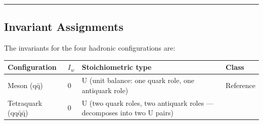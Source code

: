 \documentclass[12pt,a4paper]{article}
\begin{document}
\begin{center}\rule{0.5\linewidth}{0.5pt}\end{center}

\hypertarget{invariant-assignments}{%
\subsection{Invariant Assignments}\label{invariant-assignments}}

The invariants for the four hadronic configurations are:

\begin{longtable}[]{@{}llll@{}}
\toprule
\begin{minipage}[b]{0.22\columnwidth}\raggedright
Configuration\strut
\end{minipage} & \begin{minipage}[b]{0.22\columnwidth}\raggedright
\(I_w\)\strut
\end{minipage} & \begin{minipage}[b]{0.22\columnwidth}\raggedright
Stoichiometric type\strut
\end{minipage} & \begin{minipage}[b]{0.22\columnwidth}\raggedright
Class\strut
\end{minipage}\tabularnewline
\midrule
\endhead
\begin{minipage}[t]{0.22\columnwidth}\raggedright
Meson (qq̄)\strut
\end{minipage} & \begin{minipage}[t]{0.22\columnwidth}\raggedright
0\strut
\end{minipage} & \begin{minipage}[t]{0.22\columnwidth}\raggedright
U (unit balance: one quark role, one antiquark role)\strut
\end{minipage} & \begin{minipage}[t]{0.22\columnwidth}\raggedright
Reference\strut
\end{minipage}\tabularnewline
\begin{minipage}[t]{0.22\columnwidth}\raggedright
Tetraquark (qqq̄q̄)\strut
\end{minipage} & \begin{minipage}[t]{0.22\columnwidth}\raggedright
0\strut
\end{minipage} & \begin{minipage}[t]{0.22\columnwidth}\raggedright
U (two quark roles, two antiquark roles --- decomposes into two U
pairs)\strut
\end{minipage} & \begin{minipage}[t]{0.22\columnwidth}\raggedright

\end{minipage}
\end{longtable}
\end{document}
